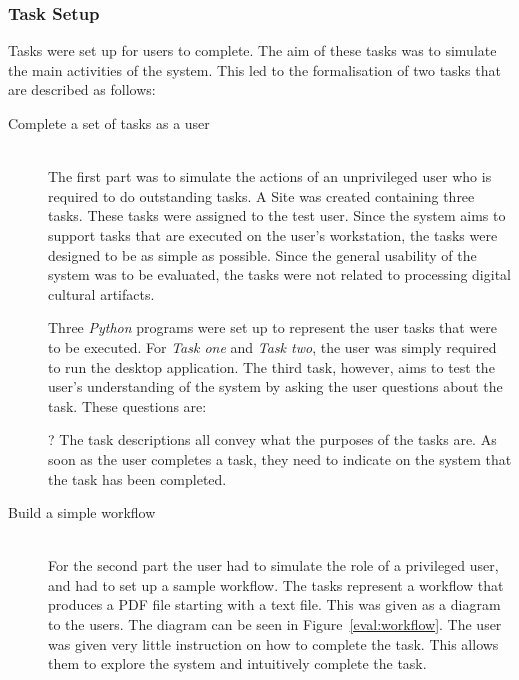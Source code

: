 \subsubsection{Task Setup}
Tasks were set up for users to complete. The aim of these tasks was to simulate
the main activities of the system. This led to the formalisation of two tasks
that are described as follows:
\begin{description}
\item[Complete a set of tasks as a user] \hfill \\
    The first part was to simulate the actions of an unprivileged user
    who is required to do outstanding tasks.  A Site was created containing three
    tasks. These tasks were assigned to the test user. Since the system aims to
    support tasks that are executed on the user's workstation, the tasks were
    designed to be as simple as possible. Since the general usability of the system
    was to be evaluated, the tasks were not related to processing digital cultural
    artifacts.

    Three \emph{Python} programs were set up to represent the user tasks
    that were to be executed. For \emph{Task one} and \emph{Task two},
    the user was simply required to run the desktop application. The third
    task, however, aims to test the user's understanding of the system by
    asking the user questions about the task. These questions are:
    ?   The task descriptions all convey what the purposes
    of the tasks are. As soon as the user completes a task, they need to
    indicate on the system that the task has been completed.
\item[Build a simple workflow] \hfill \\
    For the second part the user had to simulate the role of a privileged
    user, and had to set up a sample workflow. The tasks represent a workflow
    that produces a PDF file starting with a text file. This was given as a
    diagram to the users. The diagram can be seen in Figure~\ref{eval:workflow}.
        The user was given very little instruction on how to complete the task.
    This allows them to explore the system and intuitively complete the task.

\end{description}
